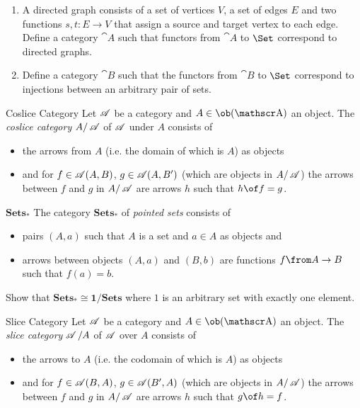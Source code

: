 \begin{exercise}
  \begin{enumerate}
    \item A directed graph consists of a set of vertices $V$, a set of edges $E$ and two functions $s, t : E \to V$ that assign a source and target vertex to each edge.
      Define a category $\cat{A}$ such that functors from $\cat{A}$ to $\Set$ correspond to directed graphs.
    \item Define a category $\cat{B}$ such that the functors from $\cat{B}$ to $\Set$ correspond to injections between an arbitrary pair of sets.
  \end{enumerate}
\end{exercise}


\begin{definition}{Coslice Category}
  Let $\operatorname{\mathscr A}$ be a category and $A\in\ob(\A)$ an object. The \emph{coslice category} $A/\operatorname{\mathscr A}$ of $\operatorname{\mathscr A}$ under $A$ consists of
  \begin{itemize}
  \item the arrows from $A$ (i.e. the domain of which is $A$) as objects
  \item and for $f\in \operatorname{\mathscr A}(A,B)$, $g\in\operatorname{\mathscr A}(A,B')$ (which are objects in $A/\operatorname{\mathscr A}$) the arrows between $f$ and $g$ in $A/\operatorname{\mathscr A}$ are arrows $h$ such that $h\of f=g$.
  \end{itemize}
\end{definition}

\begin{definition}{$\mathbf{Sets_*}$}
  The category $\mathbf{Sets_*}$ of \emph{pointed sets} consists of
  \begin{itemize}
  \item pairs $(A,a)$ such that $A$ is a set and $a\in A$ as objects and
  \item arrows between objects $(A,a)$ and $(B,b)$ are functions $f\from A\to B$ such that $f(a)=b$.
  \end{itemize}
\end{definition}

\begin{exercise}
Show that $\mathbf{Sets_*\cong 1/\mathbf{Sets}}$ where $1$ is an arbitrary set with exactly one element.
\end{exercise}

\begin{definition}{Slice Category}
  Let $\operatorname{\mathscr A}$ be a category and $A\in\ob(\A)$ an object. The \emph{slice category} $\operatorname{\mathscr A}/A$ of $\operatorname{\mathscr A}$ over $A$ consists of
  \begin{itemize}
  \item the arrows to $A$ (i.e. the codomain of which is $A$) as objects
  \item and for $f\in \operatorname{\mathscr A}(B,A)$, $g\in\operatorname{\mathscr A}(B',A)$ (which are objects in $A/\operatorname{\mathscr A}$) the arrows between $f$ and $g$ in $A/\operatorname{\mathscr A}$ are arrows $h$ such that $g\of h=f$.
  \end{itemize}
\end{definition}

